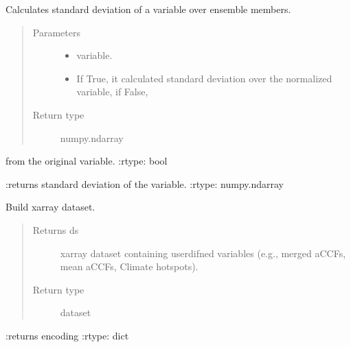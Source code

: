 \documentclass[a4paper,11pt,english]{sphinxmanual}
\begin{document}
\begin{fulllineitems}
\begin{fulllineitems}
\label{\detokenize{envlib:envlib.accf.CalAccf.get_std}}
\sphinxAtStartPar
Calculates standard deviation of a variable over ensemble members.
\begin{quote}\begin{description}
\item[{Parameters}] \leavevmode\begin{itemize}
\item {} 
\sphinxAtStartPar
{} \textendash{} variable.

\item {} 
\sphinxAtStartPar
{} \textendash{} If True, it calculated standard deviation over the normalized variable, if False,

\end{itemize}

\item[{Return type}] \leavevmode
\sphinxAtStartPar
numpy.ndarray

\end{description}\end{quote}

\sphinxAtStartPar
from the original variable.
:rtype: bool

\sphinxAtStartPar
:returns standard deviation of the variable.
:rtype: numpy.ndarray

\end{fulllineitems}


\begin{fulllineitems}
\label{\detokenize{envlib:envlib.accf.CalAccf.get_xarray}}
\sphinxAtStartPar
Build xarray dataset.
\begin{quote}\begin{description}
\item[{Returns ds}] \leavevmode
\sphinxAtStartPar
xarray dataset containing user\sphinxhyphen{}difned variables (e.g., merged aCCFs, mean aCCFs, Climate hotspots).

\item[{Return type}] \leavevmode
\sphinxAtStartPar
dataset

\end{description}\end{quote}

\sphinxAtStartPar
:returns encoding
:rtype: dict

\end{fulllineitems}


\end{fulllineitems}
\end{document}
